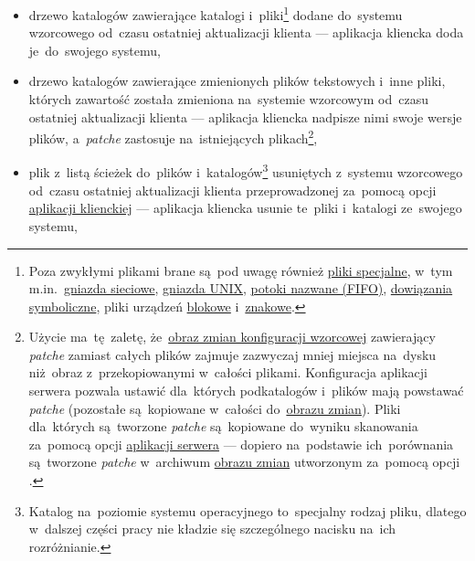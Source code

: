 \documentclass[thesis]{subfiles}
\begin{document}
\begin{itemize}
	\item drzewo katalogów  zawierające katalogi i~pliki\footnote{Poza zwykłymi plikami brane są~pod uwagę również \href{https://en.wikipedia.org/wiki/Unix_file_types}{pliki specjalne}, w~tym m.in.~\href{https://en.wikipedia.org/wiki/Network_socket}{gniazda sieciowe}, \href{https://en.wikipedia.org/wiki/Unix_domain_socket}{gniazda UNIX}, \href{https://en.wikipedia.org/wiki/Named_pipe}{potoki nazwane (FIFO)}, \href{https://en.wikipedia.org/wiki/Symbolic_link}{dowiązania symboliczne}, pliki urządzeń \href{https://en.wikipedia.org/wiki/Device_file\#Block_devices}{blokowe} i~\href{https://en.wikipedia.org/wiki/Device_file\#Character_devices}{znakowe}.} dodane do~systemu wzorcowego od~czasu ostatniej aktualizacji klienta --- aplikacja kliencka doda je~do~swojego systemu,
	\item drzewo katalogów  zawierające  zmienionych plików tekstowych i~inne pliki, których zawartość została zmieniona na~systemie wzorcowym od~czasu ostatniej aktualizacji klienta --- aplikacja kliencka nadpisze nimi swoje wersje plików, a~\emph{patche} zastosuje na~istniejących plikach\footnote{Użycie  ma~tę~zaletę, że~\hyperref[sec:obraz-zmian-konfiguracji]{obraz zmian konfiguracji wzorcowej} zawierający \emph{patche} zamiast całych plików zajmuje zazwyczaj mniej miejsca na~dysku niż~obraz z~przekopiowanymi w~całości plikami. Konfiguracja aplikacji serwera pozwala ustawić dla~których podkatalogów i~plików mają powstawać \emph{patche} (pozostałe są~kopiowane w~całości do~\hyperref[sec:obraz-zmian-konfiguracji]{obrazu zmian}). Pliki dla~których są~tworzone \emph{patche} są~kopiowane do~wyniku skanowania za~pomocą opcji  \hyperref[sec:srv-app]{aplikacji serwera} --- dopiero na~podstawie ich~porównania są~tworzone \emph{patche} w~archiwum \hyperref[sec:obraz-zmian-konfiguracji]{obrazu zmian} utworzonym za~pomocą opcji .},
	\item plik  z~listą ścieżek do~plików i~katalogów\footnote{Katalog na~poziomie  systemu operacyjnego to~specjalny rodzaj pliku, dlatego w~dalszej części pracy nie kładzie się szczególnego nacisku na~ich rozróżnianie.} usuniętych z~systemu wzorcowego od~czasu ostatniej aktualizacji klienta przeprowadzonej za~pomocą opcji  \hyperref[sec:cli-app]{aplikacji klienckiej} --- aplikacja kliencka usunie te~pliki i~katalogi ze~swojego systemu,

\end{itemize}
\end{document}
